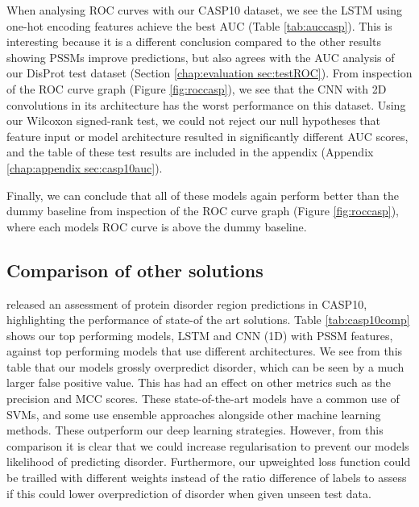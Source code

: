 \documentclass{l4proj}
\begin{document}
When analysing ROC curves with our CASP10 dataset, we see the LSTM using one-hot encoding features achieve the best AUC (Table \ref{tab:auccasp}). This is interesting because it is a different conclusion compared to the other results showing PSSMs improve predictions, but also agrees with the AUC analysis of our DisProt test dataset (Section \ref{chap:evaluation sec:testROC}). From inspection of the ROC curve graph (Figure \ref{fig:roccasp}), we see that the CNN with 2D convolutions in its architecture has the worst performance on this dataset. Using our Wilcoxon signed-rank test, we could not reject our null hypotheses that feature input or model architecture resulted in significantly different AUC scores, and the table of these test results are included in the appendix (Appendix \ref{chap:appendix sec:casp10auc}).

Finally, we can conclude that all of these models again perform better than the dummy baseline from inspection of the ROC curve graph (Figure \ref{fig:roccasp}), where each models ROC curve is above the dummy baseline.

\subsection{Comparison of other solutions}
\cite{Monastyrskyy:14} released an assessment of protein disorder region predictions in CASP10, highlighting the performance of state-of the art solutions. Table \ref{tab:casp10comp} shows our top performing models, LSTM and CNN (1D) with PSSM features, against top performing models that use different architectures. We see from this table that our models grossly overpredict disorder, which can be seen by a much larger false positive value. This has had an effect on other metrics such as the precision and MCC scores. These state-of-the-art models have a common use of SVMs, and some use ensemble approaches alongside other machine learning methods. These outperform our deep learning strategies. However, from this comparison it is clear that we could increase regularisation to prevent our models likelihood of predicting disorder. Furthermore, our upweighted loss function could be trailled with different weights instead of the ratio difference of labels to assess if this could lower overprediction of disorder when given unseen test data.
\end{document}
